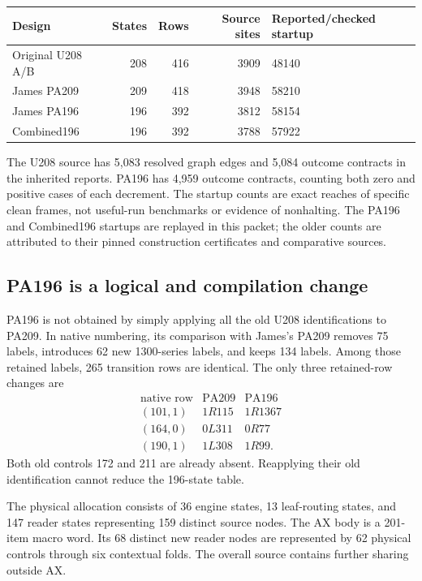 \documentclass[11pt,a4paper]{article}
\begin{document}
\begin{center}
\begin{tabular}{@{}lrrrl@{}}
\toprule
Design & States & Rows & Source sites & Reported/checked startup\\
\midrule
Original U208 A/B &208&416&3909&48140\\
James PA209 &209&418&3948&58210\\
James PA196 &196&392&3812&58154\\
Combined196 &196&392&3788&57922\\
\bottomrule
\end{tabular}
\end{center}
The U208 source has 5,083 resolved graph edges and 5,084 outcome contracts
in the inherited reports. PA196 has 4,959 outcome contracts, counting both
zero and positive cases of each decrement. The startup counts are exact
reaches of specific clean frames, not useful-run benchmarks or evidence
of nonhalting. The PA196 and Combined196 startups are replayed in this
packet; the older counts are attributed to their pinned construction
certificates and comparative sources.

\subsection{PA196 is a logical and compilation change}
PA196 is not obtained by simply applying all the old U208 identifications
to PA209. In native numbering, its comparison with James's PA209 removes
75 labels, introduces 62 new 1300-series labels, and keeps 134 labels.
Among those retained labels, 265 transition rows are identical. The only
three retained-row changes are
\[
\begin{array}{c|c|c}
\text{native row}&\text{PA209}&\text{PA196}\\\hline
(101,1)&1R115&1R1367\\
(164,0)&0L311&0R77\\
(190,1)&1L308&1R99.
\end{array}
\]
Both old controls 172 and 211 are already absent. Reapplying their old
identification cannot reduce the 196-state table.

The physical allocation consists of 36 engine states, 13 leaf-routing
states, and 147 reader states representing 159 distinct source nodes.
The AX body is a 201-item macro word. Its 68 distinct new reader nodes are
represented by 62 physical controls through six contextual folds. The
overall source contains further sharing outside AX.
\end{document}
